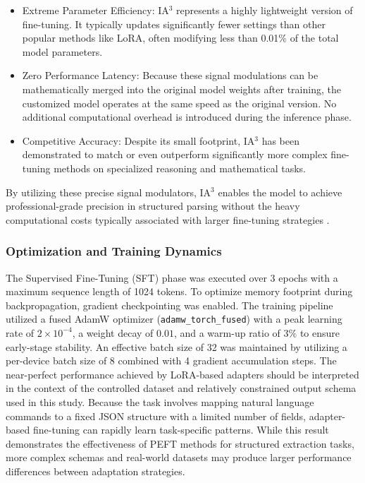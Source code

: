 \documentclass[journal,article,submit,pdftex,moreauthors]{Definitions/mdpi}
\begin{document}
\begin{itemize}
    \item Extreme Parameter Efficiency: IA$^3$ represents a highly lightweight version of fine-tuning. It typically updates significantly fewer settings than other popular methods like LoRA, often modifying less than 0.01\% of the total model parameters.
    \item Zero Performance Latency: Because these signal modulations can be mathematically merged into the original model weights after training, the customized model operates at the same speed as the original version. No additional computational overhead is introduced during the inference phase.
    \item Competitive Accuracy: Despite its small footprint, IA$^3$ has been demonstrated to match or even outperform significantly more complex fine-tuning methods on specialized reasoning and mathematical tasks.
\end{itemize}

By utilizing these precise signal modulators, IA$^3$ enables the model to achieve professional-grade precision in structured parsing without the heavy computational costs typically associated with larger fine-tuning strategies \cite{liu2022fewshotparameterefficientfinetuningbetter}.


\subsubsection{Optimization and Training Dynamics}
The Supervised Fine-Tuning (SFT) phase was executed over 3 epochs with a maximum sequence length of 1024 tokens. To optimize memory footprint during backpropagation, gradient checkpointing was enabled. The training pipeline utilized a fused AdamW optimizer (\texttt{adamw\_torch\_fused}) with a peak learning rate of $2 \times 10^{-4}$, a weight decay of $0.01$, and a warm-up ratio of $3\%$ to ensure early-stage stability. An effective batch size of 32 was maintained by utilizing a per-device batch size of 8 combined with 4 gradient accumulation steps. The near-perfect performance achieved by LoRA-based adapters should be interpreted in the context of the controlled dataset and relatively constrained output schema used in this study. Because the task involves mapping natural language commands to a fixed JSON structure with a limited number of fields, adapter-based fine-tuning can rapidly learn task-specific patterns. While this result demonstrates the effectiveness of PEFT methods for structured extraction tasks, more complex schemas and real-world datasets may produce larger performance differences between adaptation strategies.
\end{document}
